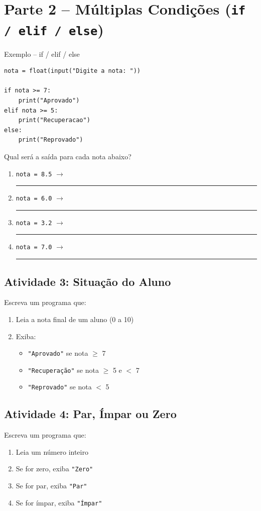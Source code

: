 \documentclass[12pt]{article}
\begin{document}
\section*{Parte 2 -- Múltiplas Condições (\texttt{if / elif / else})}

\begin{exemplobox}{Exemplo -- if / elif / else}
\begin{lstlisting}
nota = float(input("Digite a nota: "))

if nota >= 7:
    print("Aprovado")
elif nota >= 5:
    print("Recuperacao")
else:
    print("Reprovado")
\end{lstlisting}
\end{exemplobox}

\begin{fixacaobox}
Qual será a saída para cada nota abaixo?
\begin{enumerate}
    \item \texttt{nota = 8.5} $\rightarrow$ \rule{5cm}{0.4pt}
    \item \texttt{nota = 6.0} $\rightarrow$ \rule{5cm}{0.4pt}
    \item \texttt{nota = 3.2} $\rightarrow$ \rule{5cm}{0.4pt}
    \item \texttt{nota = 7.0} $\rightarrow$ \rule{5cm}{0.4pt}
\end{enumerate}
\end{fixacaobox}

\subsection*{Atividade 3: Situação do Aluno}
Escreva um programa que:
\begin{enumerate}
    \item Leia a nota final de um aluno (0 a 10)
    \item Exiba:
    \begin{itemize}
        \item \texttt{"Aprovado"} se nota $\geq$ 7
        \item \texttt{"Recuperação"} se nota $\geq$ 5 e $<$ 7
        \item \texttt{"Reprovado"} se nota $<$ 5
    \end{itemize}
\end{enumerate}

\subsection*{Atividade 4: Par, Ímpar ou Zero}
Escreva um programa que:
\begin{enumerate}
    \item Leia um número inteiro
    \item Se for zero, exiba \texttt{"Zero"}
    \item Se for par, exiba \texttt{"Par"}
    \item Se for ímpar, exiba \texttt{"Ímpar"}
\end{enumerate}
\end{document}
